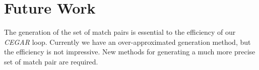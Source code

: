 \section{Future Work}
The generation of the set of match pairs is essential to the efficiency of our \textit{CEGAR} loop. Currently we have an over-approximated generation method, but the efficiency is not impressive. New methods for generating a much more precise set of match pair are required. 